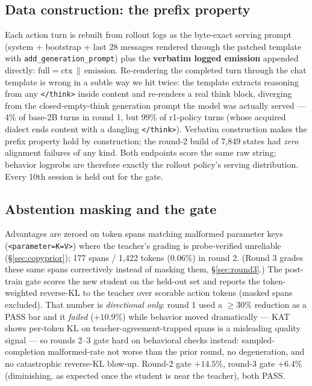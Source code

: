 \documentclass[11pt]{article}
\begin{document}
\subsection{Data construction: the prefix property}
\label{sec:prefix}
Each action turn is rebuilt from rollout logs as the byte-exact serving prompt (system +
bootstrap + last 28 messages rendered through the patched template with
\texttt{add\_generation\_prompt}) plus the \textbf{verbatim logged emission} appended directly:
$\text{full} = \text{ctx} \,\|\, \text{emission}$. Re-rendering the completed turn through the
chat template is wrong in a subtle way we hit twice: the template extracts reasoning from any
\texttt{</think>} inside content and re-renders a real think block, diverging from the
closed-empty-think generation prompt the model was actually served --- 4\% of base-2B turns in
round 1, but $99\%$ of r1-policy turns (whose acquired dialect ends content with a
dangling \texttt{</think>}). Verbatim construction makes the prefix property hold by
construction; the round-2 build of 7{,}849 states had \emph{zero} alignment failures of any
kind. Both endpoints score the same raw string; behavior logprobs are therefore exactly the
rollout policy's serving distribution. Every 10th session is held out for the gate.

\subsection{Abstention masking and the gate}
\label{sec:gate}
Advantages are zeroed on token spans matching malformed parameter keys
(\texttt{<parameter=K=V>}) where the teacher's grading is probe-verified unreliable
(\S\ref{sec:copyprior}); 177 spans / 1{,}422 tokens (0.06\%) in round 2. (Round 3 grades these
same spans correctively instead of masking them, \S\ref{sec:round3}.) The post-train gate scores
the new student on the held-out set and reports the token-weighted reverse-KL to the teacher over
scorable action tokens (masked spans excluded). That number is \emph{directional only}: round 1
used a $\ge 30\%$ reduction as a PASS bar and it \emph{failed} ($+10.9\%$) while behavior moved
dramatically --- KAT~\cite{kat} shows per-token KL on teacher-agreement-trapped spans is a
misleading quality signal --- so rounds 2--3 gate hard on behavioral checks instead:
sampled-completion malformed-rate not worse than the prior round, no degeneration, and no
catastrophic reverse-KL blow-up. Round-2 gate $+14.5\%$, round-3 gate $+6.4\%$ (diminishing, as
expected once the student is near the teacher), both PASS.
\end{document}
